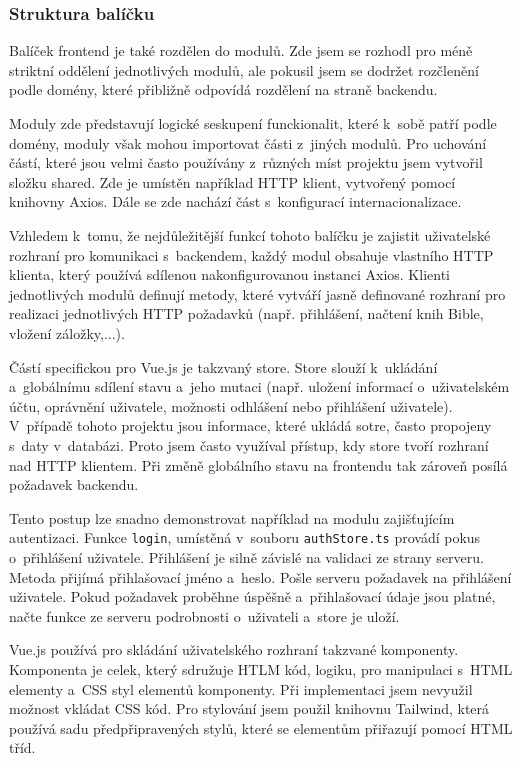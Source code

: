 \documentclass[
  tables=false,
  glossaries,
  index
]{kidiplom}
\begin{document}
\subsubsection{Struktura balíčku}
Balíček frontend je také rozdělen do modulů. Zde jsem se rozhodl pro méně striktní oddělení jednotlivých modulů, ale pokusil jsem se dodržet rozčlenění podle domény, které přibližně odpovídá rozdělení na straně backendu.

Moduly zde představují logické seskupení funckionalit, které k~sobě patří podle domény, moduly však mohou importovat části z~jiných modulů. Pro uchování částí, které jsou velmi často používány z~různých míst projektu jsem vytvořil složku shared. Zde je umístěn například HTTP klient, vytvořený pomocí knihovny Axios. Dále se zde nachází část s~konfigurací internacionalizace.

Vzhledem k~tomu, že nejdůležitější funkcí tohoto balíčku je zajistit uživatelské rozhraní pro komunikaci s~backendem, každý modul obsahuje vlastního HTTP klienta, který používá sdílenou nakonfigurovanou instanci Axios. Klienti jednotlivých modulů definují metody, které vytváří jasně definované rozhraní pro realizaci jednotlivých HTTP požadavků (např. přihlášení, načtení knih Bible, vložení záložky,...).

Částí specifickou pro Vue.js je takzvaný store. Store slouží k~ukládání a~globálnímu sdílení stavu a~jeho mutaci (např. uložení informací o~uživatelském účtu, oprávnění uživatele, možnosti odhlášení nebo přihlášení uživatele). V~případě tohoto projektu jsou informace, které ukládá sotre, často propojeny s~daty v~databázi. Proto jsem často využíval přístup, kdy store tvoří rozhraní nad HTTP klientem. Při změně globálního stavu na frontendu tak zároveň posílá požadavek backendu.

Tento postup lze snadno demonstrovat například na modulu zajišťujícím autentizaci. Funkce \texttt{login}, umístěná v~souboru \texttt{authStore.ts} provádí pokus o~přihlášení uživatele. Přihlášení je silně závislé na validaci ze strany serveru. Metoda přijímá přihlašovací jméno a~heslo. Pošle serveru požadavek na přihlášení uživatele. Pokud požadavek proběhne úspěšně a~přihlašovací údaje jsou platné, načte funkce ze serveru podrobnosti o~uživateli a~store je uloží.

Vue.js používá pro skládání uživatelského rozhraní takzvané komponenty. Komponenta je celek, který sdružuje HTLM kód, logiku, pro manipulaci s~HTML elementy a~CSS styl elementů komponenty. Při implementaci jsem nevyužil možnost vkládat CSS kód. Pro stylování jsem použil knihovnu Tailwind, která používá sadu předpřipravených stylů, které se elementům přiřazují pomocí HTML tříd.
\end{document}
